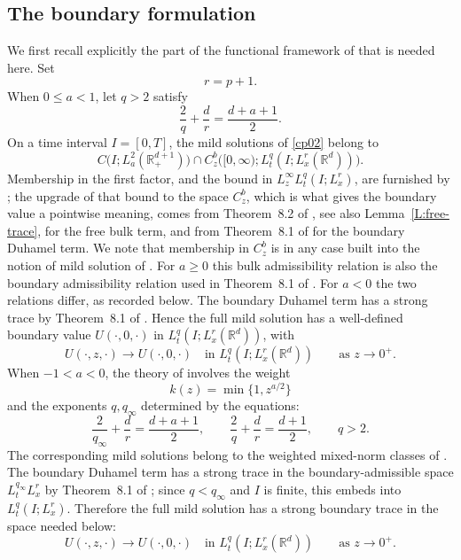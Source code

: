 \documentclass[11pt,letter]{amsart}
\def \RN {\mathbb{R}_+^{d+1}}
\newcommand{\Rd}{\mathbb R^d}
\numberwithin{equation}{section}
\numberwithin{equation}{section}
\begin{document}
\subsection{The boundary formulation}

We first recall explicitly the part of the functional framework of
\cite{GS2} that is needed here. Set
\[
r=p+1.
\]
When \(0\leq a<1\), let \(q>2\) satisfy
\begin{equation}\label{E:admissible-positive}
\frac{2}{q}+\frac{d}{r}
=
\frac{d+a+1}{2}.
\end{equation}
On a time interval \(I=[0,T]\), the mild solutions of \eqref{cp02} belong to
\begin{equation}\label{E:GS2-positive-space}
C\bigl(I;L_a^2(\RN)\bigr)
\cap
C^b_z\bigl([0,\infty);
L_t^q(I;L_x^r(\Rd))\bigr).
\end{equation}
Membership in the first factor, and the bound in $L^\infty_zL^q_t(I;L^r_x)$,
are furnished by \cite[Theorems~2.4 and~2.9]{GS2}; the upgrade of that bound to
the space $C^b_z$, which is what gives the boundary value a pointwise meaning,
comes from Theorem~8.2 of \cite{GS2}, see also Lemma~\ref{L:free-trace}, for
the free bulk term, and from Theorem~8.1 of \cite{GS2} for the boundary
Duhamel term. We note that membership in $C^b_z$ is in any case built into the
notion of mild solution of \cite[Definition~2.6]{GS2}.
For $a\ge0$ this bulk admissibility relation is also the boundary
admissibility relation used in Theorem~8.1 of \cite{GS2}.  For $a<0$ the two
relations differ, as recorded below.  The boundary Duhamel term has a strong
trace by Theorem~8.1 of \cite{GS2}. Hence the full mild solution has a well-defined boundary value
\(U(\cdot,0,\cdot)\) in $L_t^q(I;L_x^r(\Rd))$, with
\begin{equation}\label{E:positive-trace}
U(\cdot,z,\cdot)
\longrightarrow
U(\cdot,0,\cdot)
\quad\text{in }L_t^q(I;L_x^r(\Rd))
\qquad\text{as }z\to0^+.
\end{equation}
When \(-1<a<0\), the theory of \cite{GS2} involves the weight
\[
k(z)=\min\{1,z^{a/2}\}
\]
and the exponents \(q,q_\infty\) determined by the equations:
\begin{equation}\label{E:admissible-negative}
\frac{2}{q_\infty}+\frac{d}{r}
=
\frac{d+a+1}{2},
\qquad
\frac{2}{q}+\frac{d}{r}
=
\frac{d+1}{2},
\qquad q>2.
\end{equation}
The corresponding mild solutions belong to the weighted mixed-norm
classes of \cite[Theorem~2.10]{GS2}. The boundary Duhamel term has a strong
trace in the boundary-admissible space $L_t^{q_\infty}L_x^r$ by
Theorem~8.1 of \cite{GS2}; since $q<q_\infty$ and $I$ is finite, this embeds into
$L_t^q(I;L_x^r)$. Therefore the full mild solution has a strong boundary
trace in the space needed below:
\begin{equation}\label{E:negative-trace}
U(\cdot,z,\cdot)
\longrightarrow
U(\cdot,0,\cdot)
\quad\text{in }L_t^q(I;L_x^r(\Rd))
\qquad\text{as }z\to0^+.
\end{equation}
\end{document}
